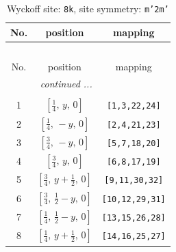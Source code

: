 \documentclass[fleqn,8pt]{jsarticle}
\begin{document}
\begin{longtable}{ccc}
\caption{Wyckoff site: {\tt 8k}, site symmetry: {\tt m'2m'}}
 \\
 \hline \hline
No. & position & mapping \\ \hline \endfirsthead

\multicolumn{2}{l}{\tablename\ \thetable{}} \\
 \hline \hline
No. & position & mapping \\ \hline \endhead

 \hline \hline
\multicolumn{2}{r}{\footnotesize\it continued ...} \\ \endfoot

 \hline \hline
\multicolumn{2}{r}{} \\ \endlastfoot

1 & $\left[ \frac{1}{4},\, y,\, 0 \right]$ & {\tt [1,3,22,24]} \\ \hline
2 & $\left[ \frac{1}{4},\, - y,\, 0 \right]$ & {\tt [2,4,21,23]} \\ \hline
3 & $\left[ \frac{3}{4},\, - y,\, 0 \right]$ & {\tt [5,7,18,20]} \\ \hline
4 & $\left[ \frac{3}{4},\, y,\, 0 \right]$ & {\tt [6,8,17,19]} \\ \hline
5 & $\left[ \frac{3}{4},\, y + \frac{1}{2},\, 0 \right]$ & {\tt [9,11,30,32]} \\ \hline
6 & $\left[ \frac{3}{4},\, \frac{1}{2} - y,\, 0 \right]$ & {\tt [10,12,29,31]} \\ \hline
7 & $\left[ \frac{1}{4},\, \frac{1}{2} - y,\, 0 \right]$ & {\tt [13,15,26,28]} \\ \hline
8 & $\left[ \frac{1}{4},\, y + \frac{1}{2},\, 0 \right]$ & {\tt [14,16,25,27]} \\
\end{longtable}
\renewcommand{\arraystretch}{1.2}
\end{document}

